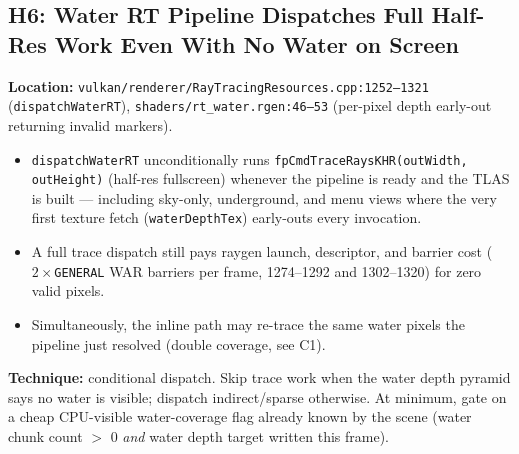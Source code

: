 \documentclass[11pt,a4paper]{article}
\begin{document}
\subsection{H6: Water RT Pipeline Dispatches Full Half-Res Work Even With No Water on Screen}

\textbf{Location:} \texttt{vulkan/renderer/RayTracingResources.cpp:1252--1321} (\texttt{dispatchWaterRT}), \texttt{shaders/rt\_water.rgen:46--53} (per-pixel depth early-out returning invalid markers).

\begin{itemize}
    \item \texttt{dispatchWaterRT} unconditionally runs \texttt{fpCmdTraceRaysKHR(outWidth, outHeight)} (half-res fullscreen) whenever the pipeline is ready and the TLAS is built --- including sky-only, underground, and menu views where the very first texture fetch (\texttt{waterDepthTex}) early-outs every invocation.
    \item A full trace dispatch still pays raygen launch, descriptor, and barrier cost ($2\times$\texttt{GENERAL} WAR barriers per frame, 1274--1292 and 1302--1320) for zero valid pixels.
    \item Simultaneously, the inline path may re-trace the same water pixels the pipeline just resolved (double coverage, see C1).
\end{itemize}

\textbf{Technique:} conditional dispatch. Skip trace work when the water depth pyramid says no water is visible; dispatch indirect/sparse otherwise. At minimum, gate on a cheap CPU-visible water-coverage flag already known by the scene (water chunk count $>$ 0 \textit{and} water depth target written this frame).
\end{document}
